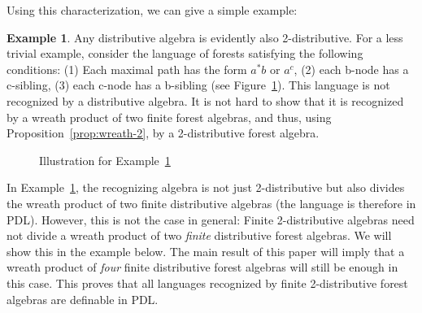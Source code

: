 \documentclass[sigplan,9pt]{acmart}\settopmatter{printfolios=true,printccs=false,printacmref=false}
\newcounter{thm}
\newcounter{theorem}
\theoremstyle{definition}
\newtheorem{example}[thm]{Example}
\newcommand{\La}[0]{{\mathcal{L}}}
\begin{document}
Using this characterization, we can give a simple example:

\begin{example}\label{ex:langs-basic}
Any distributive algebra is evidently also 2-distributive.
For a less trivial example, consider the language of forests satisfying the following conditions: 
(1) Each maximal path has the form $a^*b$ or $a^c$, (2) each b-node has a c-sibling, (3) each c-node has a b-sibling
  (see Figure~\ref{fig:ex-lang-basic}).
This language is not recognized by a distributive algebra.
It is not hard to show that it is recognized by a wreath product of two finite forest algebras, and thus, using Proposition~\ref{prop:wreath-2}, by a 2-distributive forest algebra.
\end{example}

\begin{figure}
\caption{Illustration for Example~\ref{ex:langs-basic}}\label{fig:ex-lang-basic}%
\end{figure}




In Example~\ref{ex:langs-basic}, the recognizing algebra is not just 2-distributive but also divides the wreath product of two finite distributive algebras (the language is therefore in PDL).
However, this is not the case in general:
Finite 2-distributive algebras need not divide a wreath product of two \emph{finite} distributive forest algebras.
We will show this in the example below.
The main result of this paper will imply that a wreath product of \emph{four} finite distributive forest algebras will still be enough in this case.
This proves that all languages recognized by finite 2-distributive forest algebras are definable in PDL.
\end{document}
